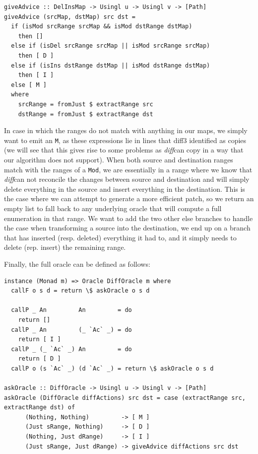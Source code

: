 \documentclass[11pt, titlepage]{article}
\newcommand{\toHaskell}[1]{\texttt{#1}\xspace}
\newcommand{\diff}{\emph{diff}}
\begin{document}
\begin{verbatim}
giveAdvice :: DelInsMap -> Usingl u -> Usingl v -> [Path]
giveAdvice (srcMap, dstMap) src dst =
  if (isMod srcRange srcMap && isMod dstRange dstMap)
    then []
  else if (isDel srcRange srcMap || isMod srcRange srcMap)
    then [ D ]
  else if (isIns dstRange dstMap || isMod dstRange dstMap)
    then [ I ]
  else [ M ]
  where
    srcRange = fromJust $ extractRange src
    dstRange = fromJust $ extractRange dst

\end{verbatim}

In case in which the ranges do not match with anything in our maps, we simply want to emit an \toHaskell{M}, as these expressions lie in lines that diff3 identified as copies (we will see that this gives rise to some problems as \diff can copy in a way that our algorithm does not support). 
When both source and destination ranges match with the ranges of a \toHaskell{Mod}, we are essentially in a range where we know that \diff can not reconcile the changes between source and destination  and will simply delete everything in the source and insert everything in the  destination. 
This is the case where we can attempt to generate a more efficient  patch, so we return an empty list to fall back to any underlying oracle that will compute a full enumeration in that range. We want to add the two other else branches to handle the case when transforming a source into the destination, we end up on a branch that has inserted (resp. deleted) everything it had to, and it simply needs to delete (rep. insert) the remaining range.

Finally, the full oracle can be defined as follows:

\begin{verbatim}
instance (Monad m) => Oracle DiffOracle m where
  callF o s d = return \$ askOracle o s d

  callP _ An         An         = do
    return []
  callP _ An         (_ `Ac` _) = do
    return [ I ]
  callP _ (_ `Ac` _) An         = do
    return [ D ]
  callP o (s `Ac` _) (d `Ac` _) = return \$ askOracle o s d

askOracle :: DiffOracle -> Usingl u -> Usingl v -> [Path]
askOracle (DiffOracle diffActions) src dst = case (extractRange src, extractRange dst) of
      (Nothing, Nothing)         -> [ M ]
      (Just sRange, Nothing)     -> [ D ]
      (Nothing, Just dRange)     -> [ I ]
      (Just sRange, Just dRange) -> giveAdvice diffActions src dst
\end{verbatim}
\end{document}
